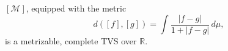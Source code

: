 $[\mathcal{M}]$, equipped with the metric
$$d([f], [g]) = \int \frac{|f - g|}{1 + |f - g|} \, d\mu,$$
is a metrizable, complete TVS over $\mathbb{R}$.
